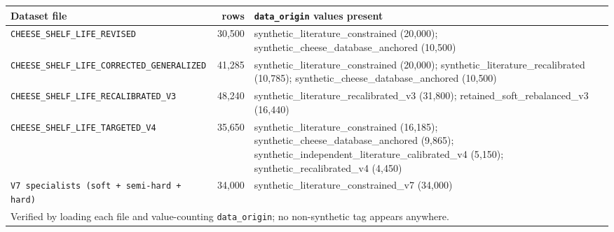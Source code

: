 \begin{tabular}{p{4.6cm}rp{7.4cm}}
\toprule
Dataset file & rows & \texttt{data\_origin} values present \\
\midrule
{\scriptsize \texttt{CHEESE\_SHELF\_LIFE\_REVISED}} & 30,500 & {\scriptsize synthetic\_literature\_constrained (20{,}000); synthetic\_cheese\_database\_anchored (10{,}500)} \\
{\scriptsize \texttt{CHEESE\_SHELF\_LIFE\_CORRECTED\_GENERALIZED}} & 41,285 & {\scriptsize synthetic\_literature\_constrained (20{,}000); synthetic\_literature\_recalibrated (10{,}785); synthetic\_cheese\_database\_anchored (10{,}500)} \\
{\scriptsize \texttt{CHEESE\_SHELF\_LIFE\_RECALIBRATED\_V3}} & 48,240 & {\scriptsize synthetic\_literature\_recalibrated\_v3 (31{,}800); retained\_soft\_rebalanced\_v3 (16{,}440)} \\
{\scriptsize \texttt{CHEESE\_SHELF\_LIFE\_TARGETED\_V4}} & 35,650 & {\scriptsize synthetic\_literature\_constrained (16{,}185); synthetic\_cheese\_database\_anchored (9{,}865); synthetic\_independent\_literature\_calibrated\_v4 (5{,}150); synthetic\_recalibrated\_v4 (4{,}450)} \\
{\scriptsize \texttt{V7 specialists (soft + semi-hard + hard)}} & 34,000 & {\scriptsize synthetic\_literature\_constrained\_v7 (34{,}000)} \\
\midrule
\multicolumn{3}{l}{\scriptsize Verified by loading each file and value-counting \texttt{data\_origin}; no non-synthetic tag appears anywhere.} \\
\bottomrule
\end{tabular}
